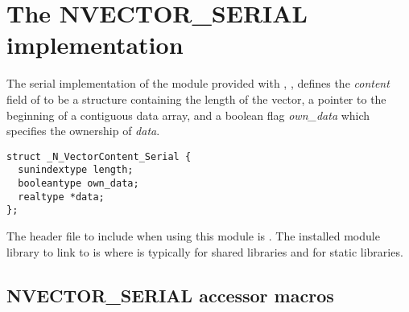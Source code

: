 \section{The NVECTOR\_SERIAL implementation}\label{ss:nvec_ser}

The serial implementation of the {\nvector} module provided with {\sundials},
{\nvecs}, defines the {\em content} field of  to be a structure 
containing the length of the vector, a pointer to the beginning of a contiguous 
data array, and a boolean flag {\em own\_data} which specifies the ownership 
of {\em data}.
\begin{verbatim} 
struct _N_VectorContent_Serial {
  sunindextype length;
  booleantype own_data;
  realtype *data;
};
\end{verbatim}

The header file to include when using this module is .
The installed module library to link to is
where  is typically  for shared libraries and 
for static libraries.


\subsection{NVECTOR\_SERIAL accessor macros}
\label{ss:nvec_ser_macros}

